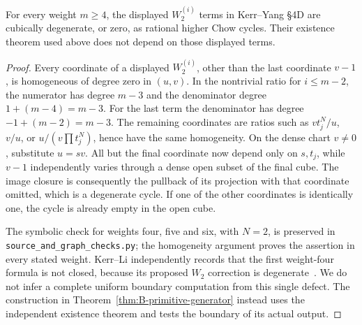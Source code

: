 \begin{lemma}
\label{lem:B-KY-degenerate}
For every weight \(m\ge4\), the displayed \(W_2^{(i)}\)
terms in Kerr--Yang \S4D are cubically degenerate, or zero,
as rational higher Chow cycles.  Their existence theorem used above
does not depend on those displayed terms.
\end{lemma}
\begin{proof}
Every coordinate of a displayed \(W_2^{(i)}\), other than the
last coordinate \(v-1\), is homogeneous of degree zero in
\((u,v)\).  In the nontrivial ratio for \(i\le m-2\), the
numerator has degree \(m-3\) and the denominator degree
\(1+(m-4)=m-3\).  For the last term the denominator has
degree \(-1+(m-2)=m-3\).  The remaining coordinates are
ratios such as \(v t_j^N/u\), \(v/u\), or
\(u/(v\prod t_j^N)\), hence have the same homogeneity.
On the dense chart \(v\ne0\), substitute \(u=sv\).
All but the final coordinate now depend only on \(s,t_j\),
while \(v-1\) independently varies through a dense open subset
of the final cube.  The image closure is consequently the pullback
of its projection with that coordinate omitted, which is a
degenerate cycle.  If one of the other coordinates is identically
one, the cycle is already empty in the open cube.

The symbolic check for weights four, five and six, with \(N=2\),
is preserved in \texttt{source\_and\_graph\_checks.py}; the
homogeneity argument proves the assertion in every stated weight.
Kerr--Li independently records that the first weight-four formula
is not closed, because its proposed \(W_2\) correction is
degenerate~\cite[p.~548, footnote~10]{BKerrLi2020}.
We do not infer a complete uniform boundary computation from this
single defect.  The construction in
Theorem~\ref{thm:B-primitive-generator} instead uses the independent
existence theorem and tests the boundary of its actual output.
\end{proof}

